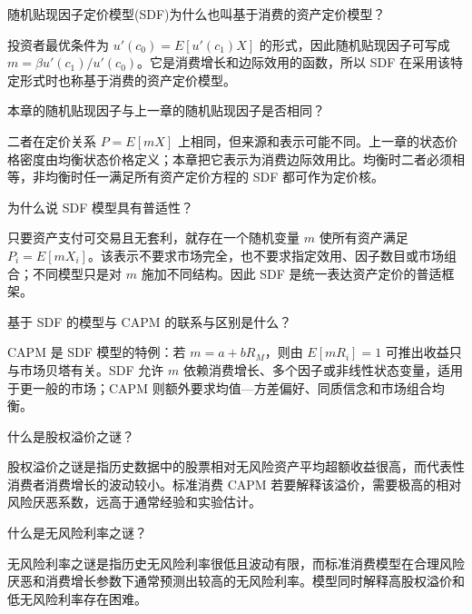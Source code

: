 
\begin{problem}
 随机贴现因子定价模型(SDF)为什么也叫基于消费的资产定价模型？
\end{problem}
\begin{solution}
投资者最优条件为 $u'(c_0)=E[u'(c_1)X]$ 的形式，因此随机贴现因子可写成 $m=\beta u'(c_1)/u'(c_0)$。它是消费增长和边际效用的函数，所以 SDF 在采用该特定形式时也称基于消费的资产定价模型。
\end{solution}
\begin{problem}
 本章的随机贴现因子与上一章的随机贴现因子是否相同？
\end{problem}
\begin{solution}
二者在定价关系 $P=E[mX]$ 上相同，但来源和表示可能不同。上一章的状态价格密度由均衡状态价格定义；本章把它表示为消费边际效用比。均衡时二者必须相等，非均衡时任一满足所有资产定价方程的 SDF 都可作为定价核。
\end{solution}
\begin{problem}
 为什么说 SDF 模型具有普适性？
\end{problem}
\begin{solution}
只要资产支付可交易且无套利，就存在一个随机变量 $m$ 使所有资产满足 $P_i=E[mX_i]$。该表示不要求市场完全，也不要求指定效用、因子数目或市场组合；不同模型只是对 $m$ 施加不同结构。因此 SDF 是统一表达资产定价的普适框架。
\end{solution}
\begin{problem}
 基于 SDF 的模型与 CAPM 的联系与区别是什么？
\end{problem}
\begin{solution}
CAPM 是 SDF 模型的特例：若 $m=a+bR_M$，则由 $E[mR_i]=1$ 可推出收益只与市场贝塔有关。SDF 允许 $m$ 依赖消费增长、多个因子或非线性状态变量，适用于更一般的市场；CAPM 则额外要求均值—方差偏好、同质信念和市场组合均衡。
\end{solution}
\begin{problem}
 什么是股权溢价之谜？
\end{problem}
\begin{solution}
股权溢价之谜是指历史数据中的股票相对无风险资产平均超额收益很高，而代表性消费者消费增长的波动较小。标准消费 CAPM 若要解释该溢价，需要极高的相对风险厌恶系数，远高于通常经验和实验估计。
\end{solution}
\begin{problem}
 什么是无风险利率之谜？
\end{problem}
\begin{solution}
无风险利率之谜是指历史无风险利率很低且波动有限，而标准消费模型在合理风险厌恶和消费增长参数下通常预测出较高的无风险利率。模型同时解释高股权溢价和低无风险利率存在困难。
\end{solution}

